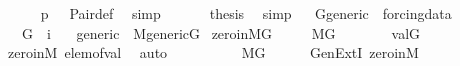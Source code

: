 \begin{isabellebody}
\ \ \ \ \isamarkupfalse%
\ {\isacartoucheopen}p\ {\isacharequal}{\kern0pt}\ {\isacharunderscore}{\kern0pt}{\isacartoucheclose}\ Pair{\isacharunderscore}{\kern0pt}def\ \isamarkupfalse%
\ {\isacharparenleft}{\kern0pt}simp{\isacharparenright}{\kern0pt}\isanewline
\ \ \isamarkupfalse%
\isanewline
\ \ \isamarkupfalse%
\ {\isacharquery}{\kern0pt}thesis\ \isamarkupfalse%
\ simp\isanewline
{}\isamarkupfalse%
%
\endisatagproof
{\isafoldproof}%
%
\isadelimproof
\isanewline
%
\endisadelimproof
\isanewline
{}\isamarkupfalse%
\ \isanewline
\isanewline
{}\isamarkupfalse%
\ G{\isacharunderscore}{\kern0pt}generic\ {\isacharequal}{\kern0pt}\ forcing{\isacharunderscore}{\kern0pt}data\ {\isacharplus}{\kern0pt}\isanewline
\ \ \ G\ {\isacharcolon}{\kern0pt}{\isacharcolon}{\kern0pt}\ {\isachardoublequoteopen}i{\isachardoublequoteclose}\isanewline
\ \ \ generic\ {\isacharcolon}{\kern0pt}\ {\isachardoublequoteopen}M{\isacharunderscore}{\kern0pt}generic{\isacharparenleft}{\kern0pt}G{\isacharparenright}{\kern0pt}{\isachardoublequoteclose}\isanewline
{}\isanewline
\isanewline
{}\isamarkupfalse%
\ zero{\isacharunderscore}{\kern0pt}in{\isacharunderscore}{\kern0pt}MG\ {\isacharcolon}{\kern0pt}\isanewline
\ \ {\isachardoublequoteopen}{}\ {\isasymin}\ M{\isacharbrackleft}{\kern0pt}G{\isacharbrackright}{\kern0pt}{\isachardoublequoteclose}\isanewline
%
\isadelimproof
%
\endisadelimproof
%
\isatagproof
{}\isamarkupfalse%
\ {\isacharminus}{\kern0pt}\isanewline
\ \ \isamarkupfalse%
\ {\isachardoublequoteopen}{}\ {\isacharequal}{\kern0pt}\ val{\isacharparenleft}{\kern0pt}G{\isacharcomma}{\kern0pt}{}{\isacharparenright}{\kern0pt}{\isachardoublequoteclose}\isanewline
\ \ \ \ \isamarkupfalse%
\ zero{\isacharunderscore}{\kern0pt}in{\isacharunderscore}{\kern0pt}M\ elem{\isacharunderscore}{\kern0pt}of{\isacharunderscore}{\kern0pt}val\ \isamarkupfalse%
\ auto\isanewline
\ \ \isamarkupfalse%
\ \isanewline
\ \ \isamarkupfalse%
\ {\isachardoublequoteopen}{\isachardot}{\kern0pt}{\isachardot}{\kern0pt}{\isachardot}{\kern0pt}\ {\isasymin}\ M{\isacharbrackleft}{\kern0pt}G{\isacharbrackright}{\kern0pt}{\isachardoublequoteclose}\isanewline
\ \ \ \ \isamarkupfalse%
\ GenExtI\ zero{\isacharunderscore}{\kern0pt}in{\isacharunderscore}{\kern0pt}M\ \isamarkupfalse%

\end{isabellebody}
